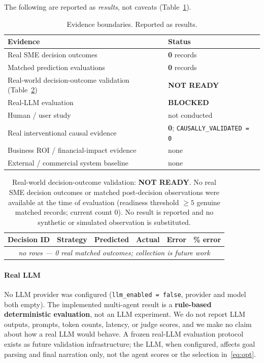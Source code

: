 \documentclass[conference]{IEEEtran}
\newcommand{\code}[1]{\texttt{#1}}
\begin{document}
The following are reported as \emph{results}, not caveats
(Table~\ref{tab:boundaries}).

\begin{table}[!t]
\caption{Evidence boundaries. Reported as results.}
\label{tab:boundaries}
\centering
\renewcommand{\arraystretch}{1.25}
\begin{tabular}{@{}p{5.0cm}p{2.6cm}@{}}
\toprule
Evidence & Status\\
\midrule
Real SME decision outcomes            & \textbf{0} records\\
Matched prediction evaluations        & \textbf{0} records\\
Real-world decision-outcome validation (Table~\ref{tab:table2}) & \textbf{NOT READY}\\
Real-LLM evaluation                   & \textbf{BLOCKED}\\
Human / user study                    & not conducted\\
Real interventional causal evidence   & \textbf{0}; \code{CAUSALLY\_VALIDATED = 0}\\
Business ROI / financial-impact evidence & none\\
External / commercial system baseline & none\\
\bottomrule
\end{tabular}
\end{table}

\begin{table}[!t]
\caption{Real-world decision-outcome validation: \textbf{NOT READY}. No real SME
decision outcomes or matched post-decision observations were available at the
time of evaluation (readiness threshold $\geq 5$ genuine matched records;
current count 0). No result is reported and no synthetic or simulated
observation is substituted.}
\label{tab:table2}
\centering
\renewcommand{\arraystretch}{1.2}
\begin{tabular}{@{}llcccc@{}}
\toprule
Decision ID & Strategy & Predicted & Actual & Error & \% error\\
\midrule
\multicolumn{6}{c}{\emph{no rows --- 0 real matched outcomes; collection is future work}}\\
\bottomrule
\end{tabular}
\end{table}

\paragraph{Real LLM}
No LLM provider was configured (\code{llm\_enabled = false}, provider and model
both empty). The implemented multi-agent result is a \textbf{rule-based
deterministic evaluation}, not an LLM experiment. We do not report LLM outputs,
prompts, token counts, latency, or judge scores, and we make no claim about how
a real LLM would behave. A frozen real-LLM evaluation protocol exists as future
validation infrastructure; the LLM, when configured, affects goal parsing and
final narration only, not the agent scores or the selection in~\eqref{eq:opt}.
\end{document}
